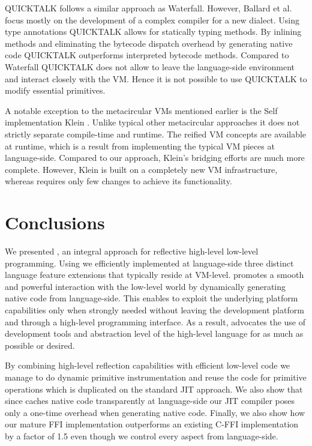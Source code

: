 QUICKTALK \cite{Ball86a} follows a similar approach as Waterfall.
However, Ballard et al. focus mostly on the development of a complex compiler for a new \ST dialect.
Using type annotations QUICKTALK allows for statically typing methods.
By inlining methods and eliminating the bytecode dispatch overhead by generating native code QUICKTALK outperforms interpreted bytecode methods.
Compared to Waterfall QUICKTALK does not allow to leave the language-side environment and interact closely with the VM.
Hence it is not possible to use QUICKTALK to modify essential primitives.

A notable exception to the metacircular VMs mentioned earlier is the Self implementation Klein \cite{Unga05a}.
Unlike typical other metacircular approaches it does not strictly separate compile-time and runtime.
The reified VM concepts are available at runtime, which is a result from implementing the typical VM pieces at language-side.
Compared to our approach, Klein's bridging efforts are much more complete.
However, Klein is built on a completely new VM infrastructure, whereas \B requires only few changes to achieve its functionality.


\section{Conclusions}

We presented \B, an integral approach for reflective high-level low-level programming.
Using \B we efficiently implemented at language-side three distinct language feature extensions that typically reside at VM-level.
\B promotes a smooth and powerful interaction with the low-level world by dynamically generating native code from language-side.
This enables to exploit the underlying platform capabilities only when strongly needed without leaving the development platform and through a high-level programming interface. 
As a result, \B advocates the use of development tools and abstraction level of the high-level language for as much as possible or desired.

By combining high-level reflection capabilities with efficient low-level code we manage to do dynamic primitive instrumentation and reuse the code for primitive operations which is duplicated on the standard JIT approach.
We also show that since \B caches native code transparently at language-side our JIT compiler poses only a one-time overhead when generating native code. 
Finally, we also show how our mature FFI implementation outperforms an existing C-FFI implementation by a factor of 1.5 even though we control every aspect from language-side.


